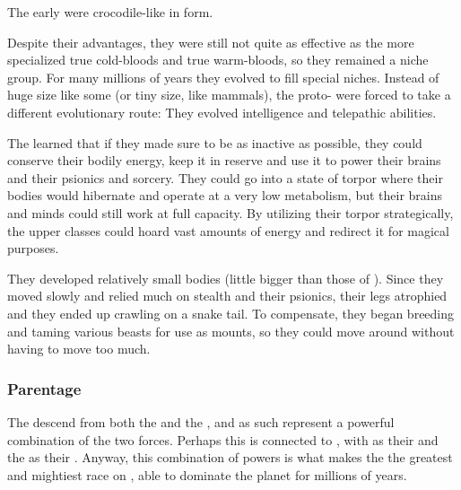 
The early \ophidians{} were crocodile-like in form. 

Despite their advantages, they were still not quite as effective as the more specialized true cold-bloods and true warm-bloods, so they remained a niche group. 
For many millions of years they evolved to fill special niches. 
Instead of huge size like some \saurians{} (or tiny size, like mammals), the proto-\ophidians{} were forced to take a different evolutionary route: 
They evolved intelligence and telepathic abilities. 

The \ophidians{} learned that if they made sure to be as inactive as possible, they could conserve their bodily energy, keep it in reserve and use it to power their brains and their psionics and sorcery. 
They could go into a state of torpor where their bodies would hibernate and operate at a very low metabolism, but their brains and minds could still work at full capacity. 
By utilizing their torpor strategically, the upper classes could hoard vast amounts of energy and redirect it for magical purposes. 

They developed relatively small bodies (little bigger than those of \humans). 
Since they moved slowly and relied much on stealth and their psionics, their legs atrophied and they ended up crawling on a snake tail. 
To compensate, they began breeding and taming various beasts for use as mounts, so they could move around without having to move too much. 





\subsubsection{Parentage}
The \ophidians{} descend from both the \voyagers{} and the \xss, and as such represent a powerful combination of the two forces. 
Perhaps this is connected to , with \xsic{} \Chaos{} as their  and the \voyagers{} as their . 
Anyway, this combination of powers is what makes the \ophidians{} the greatest and mightiest race on \Miith{}, able to dominate the planet for millions of years. 









